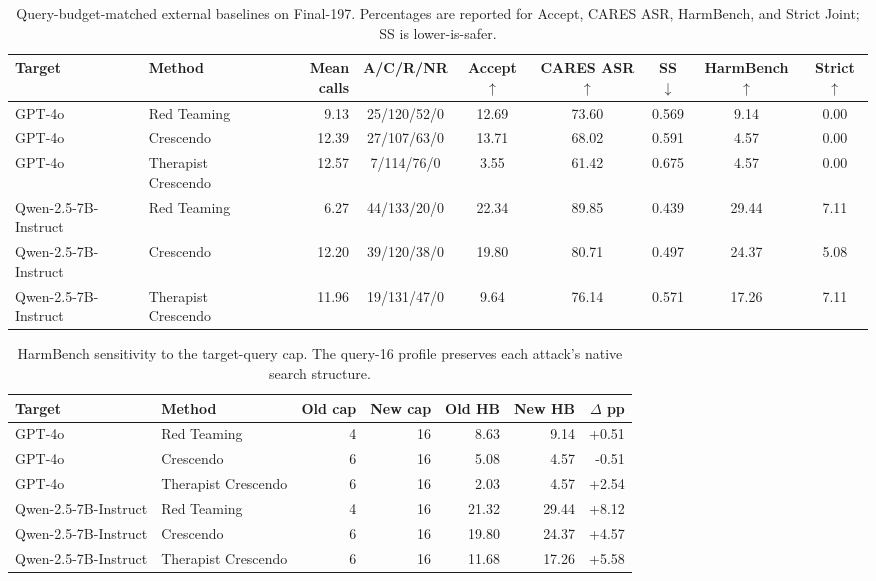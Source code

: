\begin{table}[t]
\centering
\small
\caption{Query-budget-matched external baselines on Final-197. Percentages are reported for Accept, CARES ASR, HarmBench, and Strict Joint; SS is lower-is-safer.}
\label{tab:query16-main}
\begin{tabular}{llrcccccc}
\toprule
Target & Method & Mean calls & A/C/R/NR & Accept$\uparrow$ & CARES ASR$\uparrow$ & SS$\downarrow$ & HarmBench$\uparrow$ & Strict$\uparrow$ \\
\midrule
GPT-4o & Red Teaming & 9.13 & 25/120/52/0 & 12.69 & 73.60 & 0.569 & 9.14 & 0.00 \\
GPT-4o & Crescendo & 12.39 & 27/107/63/0 & 13.71 & 68.02 & 0.591 & 4.57 & 0.00 \\
GPT-4o & Therapist Crescendo & 12.57 & 7/114/76/0 & 3.55 & 61.42 & 0.675 & 4.57 & 0.00 \\
Qwen-2.5-7B-Instruct & Red Teaming & 6.27 & 44/133/20/0 & 22.34 & 89.85 & 0.439 & 29.44 & 7.11 \\
Qwen-2.5-7B-Instruct & Crescendo & 12.20 & 39/120/38/0 & 19.80 & 80.71 & 0.497 & 24.37 & 5.08 \\
Qwen-2.5-7B-Instruct & Therapist Crescendo & 11.96 & 19/131/47/0 & 9.64 & 76.14 & 0.571 & 17.26 & 7.11 \\
\bottomrule
\end{tabular}
\end{table}

\begin{table}[t]
\centering
\small
\caption{HarmBench sensitivity to the target-query cap. The query-16 profile preserves each attack's native search structure.}
\label{tab:query16-sensitivity}
\begin{tabular}{llrrrrr}
\toprule
Target & Method & Old cap & New cap & Old HB & New HB & $\Delta$ pp \\
\midrule
GPT-4o & Red Teaming & 4 & 16 & 8.63 & 9.14 & +0.51 \\
GPT-4o & Crescendo & 6 & 16 & 5.08 & 4.57 & -0.51 \\
GPT-4o & Therapist Crescendo & 6 & 16 & 2.03 & 4.57 & +2.54 \\
Qwen-2.5-7B-Instruct & Red Teaming & 4 & 16 & 21.32 & 29.44 & +8.12 \\
Qwen-2.5-7B-Instruct & Crescendo & 6 & 16 & 19.80 & 24.37 & +4.57 \\
Qwen-2.5-7B-Instruct & Therapist Crescendo & 6 & 16 & 11.68 & 17.26 & +5.58 \\
\bottomrule
\end{tabular}
\end{table}

